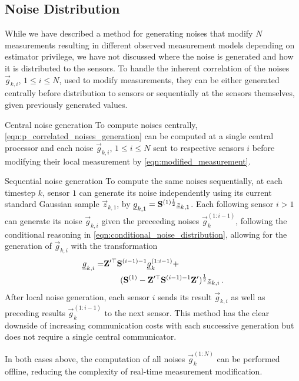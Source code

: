 \documentclass[conference]{IEEEtran}
\theoremstyle{definition}
\theoremstyle{remark}
\begin{document}
% 
% 

\subsection{Noise Distribution}\label{subsec:noise_dist}
While we have described a method for generating noises that modify $N$ measurements resulting in different observed measurement models depending on estimator privilege, we have not discussed where the noise is generated and how it is distributed to the sensors. To handle the inherent correlation of the noises $\vec{g}_{k,i}$, $1\leq i \leq N$, used to modify measurements, they can be either generated centrally before distribution to sensors or sequentially at the sensors themselves, given previously generated values.
\begin{LaTeXdescription}
  \item[Central noise generation] To compute noises centrally, \eqref{eqn:p_correlated_noises_generation} can be computed at a single central processor and each noise $\vec{g}_{k,i}$, $1\leq i \leq N$ sent to respective sensors $i$ before modifying their local measurement by \eqref{eqn:modified_measurement}.
  \item[Sequential noise generation] To compute the same noises sequentially, at each timestep $k$, sensor $1$ can generate its noise independently using its current standard Gaussian sample $\vec{z}_{k,1}$, by ${\underline{g}}_{k,1} = {{\mathbf{S}}}^{(1)\frac{1}{2}}{\underline{z}}_{k,1}$. Each following sensor $i>1$ can generate its noise $\vec{g}_{k,i}$ given the preceeding noises $\vec{g}_k^{(1:i-1)}$, following the conditional reasoning in \eqref{eqn:conditional_noise_distribution}, allowing for the generation of $\vec{g}_{k,i}$ with the transformation
  \begin{equation}
    \begin{split}
      {\underline{g}}_{k,i} = &{{\mathbf{Z}}}^{\prime\top}{{\mathbf{S}}}^{(i-1)-1}{\underline{g}}_k^{(1:i-1)} +\\
      &\qquad ({{\mathbf{S}}}^{(1)}-{{\mathbf{Z}}}^{\prime\top}{{\mathbf{S}}}^{(i-1)-1}{{\mathbf{Z}}}^\prime)^\frac{1}{2}{\underline{z}}_{k,i}\,.
    \end{split}
  \end{equation}
  After local noise generation, each sensor $i$ sends its result $\vec{g}_{k,i}$ as well as preceding results $\vec{g}_k^{(1:i-1)}$ to the next sensor. This method has the clear downside of increasing communication costs with each successive generation but does not require a single central communicator.
\end{LaTeXdescription}
In both cases above, the computation of all noises $\vec{g}_k^{(1:N)}$ can be performed offline, reducing the complexity of real-time measurement modification.
\end{document}
